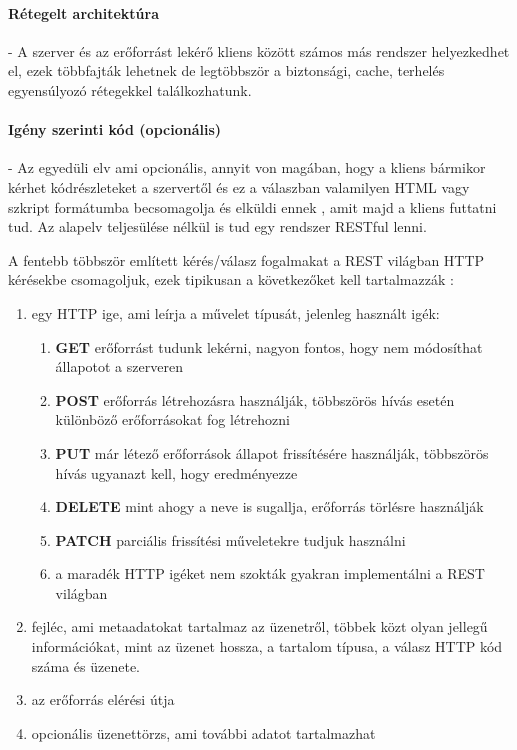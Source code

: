 \paragraph{Rétegelt architektúra} - A szerver és az erőforrást lekérő kliens között számos más rendszer helyezkedhet el, ezek többfajták lehetnek de legtöbbször a biztonsági, cache, terhelés egyensúlyozó rétegekkel találkozhatunk.
\paragraph{Igény szerinti kód (opcionális)} - Az egyedüli elv ami opcionális, annyit von magában, hogy a kliens bármikor kérhet kódrészleteket a szervertől és ez a válaszban valamilyen HTML vagy szkript formátumba becsomagolja és elküldi ennek , amit majd a kliens futtatni tud. Az alapelv teljesülése nélkül is tud egy rendszer RESTful lenni.


A fentebb többször említett kérés/válasz fogalmakat a REST világban HTTP kérésekbe csomagoljuk, ezek tipikusan a következőket kell tartalmazzák \cite{rest_2} :
\begin{enumerate}
	\item egy HTTP ige, ami leírja a művelet típusát, jelenleg használt igék:
	\begin{enumerate}
		\item \textbf{GET} erőforrást tudunk lekérni, nagyon fontos, hogy nem módosíthat állapotot a szerveren
		\item \textbf{POST} erőforrás létrehozásra használják, többszörös hívás esetén különböző erőforrásokat fog létrehozni
		\item \textbf{PUT} már létező erőforrások állapot frissítésére használják, többszörös hívás ugyanazt kell, hogy eredményezze
		\item \textbf{DELETE} mint ahogy a neve is sugallja, erőforrás törlésre használják 
		\item \textbf{PATCH} parciális frissítési műveletekre tudjuk használni
		\item a maradék HTTP igéket nem szokták gyakran implementálni a REST világban
	\end{enumerate} 
	\item fejléc, ami metaadatokat tartalmaz az üzenetről, többek közt olyan jellegű információkat, mint az üzenet hossza, a tartalom típusa, a válasz HTTP kód száma és üzenete.
	\item az erőforrás elérési útja
	\item opcionális üzenettörzs, ami további adatot tartalmazhat
\end{enumerate}


